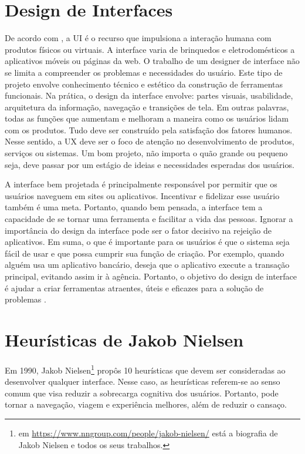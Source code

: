 \section{Design de Interfaces}
\label{Design de Interfaces (UI)}
De acordo com , a \acf{UI} é o recurso que impulsiona a interação humana com produtos físicos ou virtuais. A interface varia de brinquedos e eletrodomésticos a aplicativos móveis ou páginas da web. O trabalho de um designer de interface não se limita a compreender os problemas e necessidades do usuário. Este tipo de projeto envolve conhecimento técnico e estético da construção de ferramentas funcionais. Na prática, o design da interface envolve: partes visuais, usabilidade, arquitetura da informação, navegação e transições de tela. Em outras palavras, todas as funções que aumentam e melhoram a maneira como os usuários lidam com os produtos. Tudo deve ser construído pela satisfação dos fatores humanos. Nesse sentido, a \acf{UX} deve ser o foco de atenção no desenvolvimento de produtos, serviços ou sistemas. Um bom projeto, não importa o quão grande ou pequeno seja, deve passar por um estágio de ideias e necessidades esperadas dos usuários.

A interface bem projetada é principalmente responsável por permitir que os usuários naveguem em sites ou aplicativos. Incentivar e fidelizar esse usuário também é uma meta. Portanto, quando bem pensada, a interface tem a capacidade de se tornar uma ferramenta e facilitar a vida das pessoas. Ignorar a importância do design da interface pode ser o fator decisivo na rejeição de aplicativos. Em suma, o que é importante para os usuários é que o sistema seja fácil de usar e que possa cumprir sua função de criação. Por exemplo, quando alguém usa um aplicativo bancário, deseja que o aplicativo execute a transação principal, evitando assim ir à agência. Portanto, o objetivo do design de interface é ajudar a criar ferramentas atraentes, úteis e eficazes para a solução de problemas \cite{maia2016designui}.

\section{Heurísticas de Jakob Nielsen}
\label{Heurísticas de Jakob Nielsen}

Em 1990, Jakob Nielsen\footnote{em \url{https://www.nngroup.com/people/jakob-nielsen/} está a biografia de Jakob Nielsen e todos os seus trabalhos.} propôs 10 heurísticas que devem ser consideradas ao desenvolver qualquer interface. Nesse caso, as heurísticas referem-se ao senso comum que visa reduzir a sobrecarga cognitiva dos usuários. Portanto, pode tornar a navegação, viagem e experiência melhores, além de reduzir o cansaço. 

